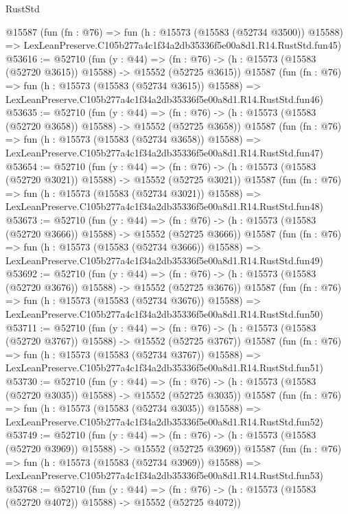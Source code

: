 \begin{lexlean}{RustStd}
\begin{coremodule}
    @15587
    (fun (fn : @76) =>
    fun (h : @15573 (@15583 (@52734 @3500)) @15588) =>
    LexLeanPreserve.C105b277a4c1f34a2db35336f5e00a8d1.R14.RustStd.fun45)
@53616 := @52710
    (fun (y : @44) =>
    (fn : @76) -> (h : @15573 (@15583 (@52720 @3615)) @15588) -> @15552 (@52725 @3615))
    @15587
    (fun (fn : @76) =>
    fun (h : @15573 (@15583 (@52734 @3615)) @15588) =>
    LexLeanPreserve.C105b277a4c1f34a2db35336f5e00a8d1.R14.RustStd.fun46)
@53635 := @52710
    (fun (y : @44) =>
    (fn : @76) -> (h : @15573 (@15583 (@52720 @3658)) @15588) -> @15552 (@52725 @3658))
    @15587
    (fun (fn : @76) =>
    fun (h : @15573 (@15583 (@52734 @3658)) @15588) =>
    LexLeanPreserve.C105b277a4c1f34a2db35336f5e00a8d1.R14.RustStd.fun47)
@53654 := @52710
    (fun (y : @44) =>
    (fn : @76) -> (h : @15573 (@15583 (@52720 @3021)) @15588) -> @15552 (@52725 @3021))
    @15587
    (fun (fn : @76) =>
    fun (h : @15573 (@15583 (@52734 @3021)) @15588) =>
    LexLeanPreserve.C105b277a4c1f34a2db35336f5e00a8d1.R14.RustStd.fun48)
@53673 := @52710
    (fun (y : @44) =>
    (fn : @76) -> (h : @15573 (@15583 (@52720 @3666)) @15588) -> @15552 (@52725 @3666))
    @15587
    (fun (fn : @76) =>
    fun (h : @15573 (@15583 (@52734 @3666)) @15588) =>
    LexLeanPreserve.C105b277a4c1f34a2db35336f5e00a8d1.R14.RustStd.fun49)
@53692 := @52710
    (fun (y : @44) =>
    (fn : @76) -> (h : @15573 (@15583 (@52720 @3676)) @15588) -> @15552 (@52725 @3676))
    @15587
    (fun (fn : @76) =>
    fun (h : @15573 (@15583 (@52734 @3676)) @15588) =>
    LexLeanPreserve.C105b277a4c1f34a2db35336f5e00a8d1.R14.RustStd.fun50)
@53711 := @52710
    (fun (y : @44) =>
    (fn : @76) -> (h : @15573 (@15583 (@52720 @3767)) @15588) -> @15552 (@52725 @3767))
    @15587
    (fun (fn : @76) =>
    fun (h : @15573 (@15583 (@52734 @3767)) @15588) =>
    LexLeanPreserve.C105b277a4c1f34a2db35336f5e00a8d1.R14.RustStd.fun51)
@53730 := @52710
    (fun (y : @44) =>
    (fn : @76) -> (h : @15573 (@15583 (@52720 @3035)) @15588) -> @15552 (@52725 @3035))
    @15587
    (fun (fn : @76) =>
    fun (h : @15573 (@15583 (@52734 @3035)) @15588) =>
    LexLeanPreserve.C105b277a4c1f34a2db35336f5e00a8d1.R14.RustStd.fun52)
@53749 := @52710
    (fun (y : @44) =>
    (fn : @76) -> (h : @15573 (@15583 (@52720 @3969)) @15588) -> @15552 (@52725 @3969))
    @15587
    (fun (fn : @76) =>
    fun (h : @15573 (@15583 (@52734 @3969)) @15588) =>
    LexLeanPreserve.C105b277a4c1f34a2db35336f5e00a8d1.R14.RustStd.fun53)
@53768 := @52710
    (fun (y : @44) =>
    (fn : @76) -> (h : @15573 (@15583 (@52720 @4072)) @15588) -> @15552 (@52725 @4072))

\end{coremodule}
\end{lexlean}
